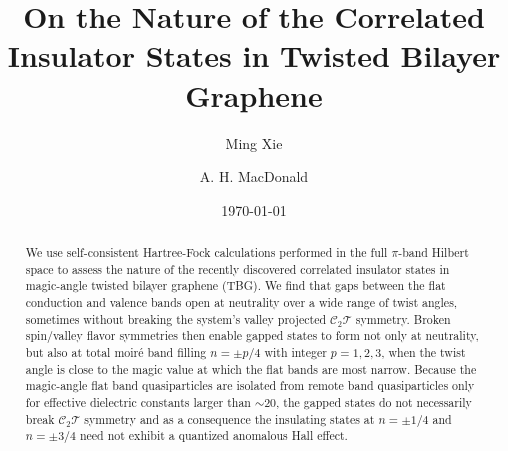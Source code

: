 \documentclass[aps,prl,reprint,amssymb,groupedaddress,twocolumn]{revtex4}
\newcommand{\CT}{$\mathcal{C}_2\mathcal{T}$ }
\begin{document}
\title{On the Nature of the Correlated Insulator States in Twisted Bilayer Graphene}
\author{Ming Xie}
\author{A. H. MacDonald}

\date{\today}

\begin{abstract}
We use self-consistent Hartree-Fock calculations performed in the full 
$\pi$-band Hilbert space to assess the nature of the recently 
discovered correlated insulator states in magic-angle twisted bilayer graphene (TBG).
We find that gaps between the 
flat conduction and valence bands open at neutrality over a wide range of twist angles,
sometimes without breaking the system's valley projected \CT
symmetry.  Broken spin/valley flavor symmetries then enable
gapped states to form not only at neutrality, but also at total moir\'e band filling 
$n = \pm p/4$ with integer $p = 1, 2, 3$, when the twist angle is close to the magic 
value at which the flat bands are most narrow. 
Because the magic-angle flat band quasiparticles are isolated from remote band quasiparticles only for 
effective dielectric constants larger than $ \sim 20$, the gapped states do not 
necessarily break \CT symmetry and as a consequence the insulating states at 
$n = \pm 1/4$ and $n = \pm 3/4$ need not 
exhibit a quantized anomalous Hall effect. 
\end{abstract}

\maketitle
\end{document}
